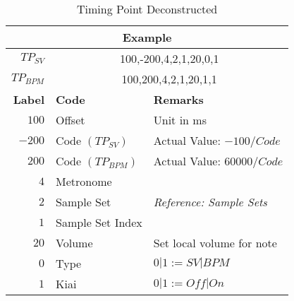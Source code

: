 \begin{table}[ht]
	\begin{center}
    \caption{Timing Point Deconstructed}
    \label{tab:tbl_tp_dec}
    \begin{tabular}{r	|l|l}
		\multicolumn{3}{c}{\textbf{Example}} \\
		\hline
		\textbf{$TP_{SV}$}  & \multicolumn{2}{c}{100,-200,4,2,1,20,0,1} \\
		\textbf{$TP_{BPM}$} & \multicolumn{2}{c}{100,200,4,2,1,20,1,1} \\
		\hline
		\textbf{Label} & \textbf{Code} & \textbf{Remarks}\\
		\hline
		$ 100 $  & Offset              & Unit in ms\\
		$ -200 $ & Code $ (TP_{SV}) $  & Actual Value: $-100 / Code$\\
		$ 200 $  & Code $ (TP_{BPM}) $ & Actual Value: $60000 / Code$\\
		$ 4 $    & Metronome           & {}\\
		$ 2 $    & Sample Set          & \textit{Reference: Sample Sets}\\
		$ 1 $    & Sample Set Index    & {}\\
		$ 20 $   & Volume              & Set local volume for note\\
		$ 0 $    & Type                & $0|1 := SV|BPM$ \\	
		$ 1 $    & Kiai                & $0|1 := Off|On$\\		
	\end{tabular}
	\end{center}
\end{table}

